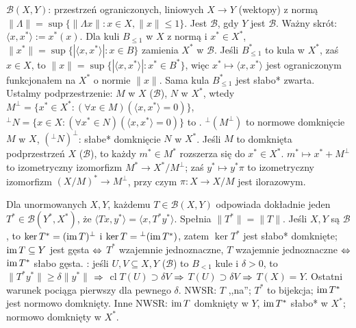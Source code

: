 $\mathcal B(X, Y)$:  przestrzeń ograniczonych, liniowych $X \to Y$ (wektopy) z normą $\|\Lambda\| = \sup\{\|\Lambda x\| : x \in X, \|x\| \le 1\}$.
Jest $\mathscr B$, gdy $Y$ jest $\mathscr B$.
Ważny skrót: $\langle x, x^* \rangle := x^*(x)$.
Dla kuli $B_{\le 1}$ w $X$ z normą i $x^* \in X^*$, $\|x^*\| = \sup \{|\langle x, x^* \rangle| : x \in B\}$ zamienia $X^*$ w $\mathscr B$.
Jeśli $B^*_{\le 1}$ to kula w $X^*$, zaś $x \in X$, to $\|x\| = \sup\{|\langle x, x^*\rangle| : x^* \in B^*\}$, więc $x^* \mapsto \langle x, x^*\rangle$ jest ograniczonym funkcjonałem na $X^*$ o normie $\|x\|$.
Sama kula $B^*_{\le 1}$ jest słabo* zwarta.
Ustalmy podprzestrzenie: $M$ w $X$ ($\mathscr B$), $N$ w $X^*$, wtedy $M^\perp = \{x^* \in X^* : (\forall x \in M) (\langle x, x^* \rangle = 0)\}$, ${}^\perp N = \{x \in X : (\forall x^* \in N) (\langle x, x^* \rangle = 0)\}$ to .
${}^\perp(M^\perp)$ to normowe domknięcie $M$ w $X$, $({}^\perp N)^\perp$: słabe* domknięcie $N$ w $X^*$.
Jeśli $M$ to domknięta podprzestrzeń $X$ ($\mathscr B$), to każdy $m^* \in M^*$ rozszerza się do $x^* \in X^*$.
$m^* \mapsto x^* + M^\perp$ to izometryczny izomorfizm $M^* \to X^*/M^\perp$; zaś $y^* \mapsto y^* \pi$ to izometryczny izomorfizm $(X/M)^* \to M^\perp$, przy czym $\pi \colon X \to X/M$ jest ilorazowym.

Dla  unormowanych $X, Y$, każdemu $T \in \mathcal B(X,Y)$ odpowiada dokładnie jeden $T^* \in \mathcal B(Y^*, X^*)$, że $\langle Tx , y^*\rangle = \langle x, T^*y^*\rangle$.
Spełnia  $\|T^*\| = \|T\|$.
Jeśli $X, Y$ są $\mathscr B$, to $\ker T^* = (\operatorname{im} T)^\perp$ i $\ker T = {}^\perp (\operatorname{im} T^*)$, zatem $\ker T^*$ jest słabo* domknięte; $\operatorname{im} T \subseteq Y$ jest gęsta $\Leftrightarrow$ $T^*$ wzajemnie jednoznaczne, $T$ wzajemnie jednoznaczne $\Leftrightarrow$ $\operatorname{im} T^*$ słabo gęsta.
: jeśli $U, V \subseteq X, Y$ ($\mathscr B$) to $B_{< 1}$ kule i $\delta > 0$, to $\|T^*y^*\| \ge \delta \|y^*\|$ $\Rightarrow$ $\operatorname{cl}T(U) \supset \delta V$ $\Rightarrow$ $T(U) \supset \delta V$ $\Rightarrow$ $T(X) = Y$.
Ostatni warunek pociąga pierwszy dla pewnego $\delta$.
NWSR: $T$ ,,na''; $T^*$ to bijekcja; $\operatorname{im} T^*$ jest normowo domknięty.
Inne NWSR: $\operatorname{im} T$ domknięty w $Y$, $\operatorname{im} T^*$ słabo* w $X^*$; normowo domknięty w $X^*$.

